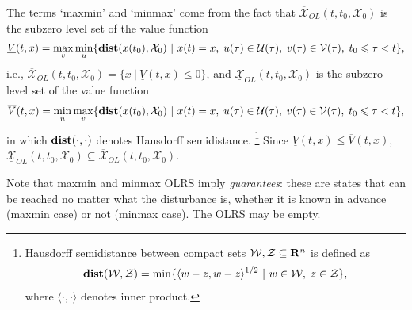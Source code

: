 \documentclass[letterpaper,10pt,english]{sphinxmanual}
\begin{document}
The terms ‘maxmin’ and ‘minmax’ come from the fact that
$\overline{{\mathcal X}}_{OL}(t, t_0, {\mathcal X}_0)$ is the
subzero level set of the value function
\label{chap_reach:equation-maxminvf}\begin{gather}
\begin{split}\underline{V}(t, x) =
\max_v\min_u\{{\bf dist}(x(t_0), {\mathcal X}_0) ~|~ x(t)=x, \; u(\tau)\in{\mathcal U}(\tau), \;
v(\tau)\in{\mathcal V}(\tau), \; t_0\leqslant\tau<t\},\end{split}\label{chap_reach-maxminvf}
\end{gather}
i.e.,
$\overline{{\mathcal X}}_{OL}(t, t_0, {\mathcal X}_0) = \{ x~|~\underline{V}(t, x) \leqslant0\}$,
and $\underline{{\mathcal X}}_{OL}(t, t_0, {\mathcal X}_0)$ is the
subzero level set of the value function
\label{chap_reach:equation-minmaxvf}\begin{gather}
\begin{split}\overline{V}(t, x) =
\min_u\max_v\{{\bf dist}(x(t_0), {\mathcal X}_0) ~|~ x(t)=x, \; u(\tau)\in{\mathcal U}(\tau), \;
v(\tau)\in{\mathcal V}(\tau), \; t_0\leqslant\tau<t\},\end{split}\label{chap_reach-minmaxvf}
\end{gather}
in which ${\bf dist}(\cdot, \cdot)$ denotes Hausdorff
semidistance. \footnote{
Hausdorff semidistance between compact sets
${\mathcal W}, {\mathcal Z}\subseteq {\bf R}^n$ is defined as
\begin{gather}
\begin{split}{\bf dist}({\mathcal W}, {\mathcal Z}) = \min\{\langle w-z, w-z\rangle^{1/2}
~|~ w\in{\mathcal W}, \; z\in{\mathcal Z}\},\end{split}\notag
\end{gather}
where $\langle\cdot, \cdot\rangle$ denotes inner product.
} Since
$\underline{V}(t, x)\leqslant\overline{V}(t, x)$,
$\underline{{\mathcal X}}_{OL}(t, t_0, {\mathcal X}_0)\subseteq\overline{{\mathcal X}}_{OL}(t, t_0, {\mathcal X}_0)$.

Note that maxmin and minmax OLRS imply \emph{guarantees}: these are states
that can be reached no matter what the disturbance is, whether it is
known in advance (maxmin case) or not (minmax case). The OLRS may be
empty.
\end{document}
